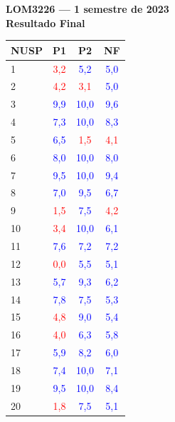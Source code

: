 \documentclass[12pt]{article}
\begin{document}
\thispagestyle{empty}
\centering
\begin{center}
{\LARGE \bfseries LOM3226 --- 1\textordmasculine{} semestre de 2023}\\[4mm] 
{\Large \bfseries Resultado Final} 
\end{center} 
\vfill
\begin{multicols}{2}
\centering 
{} 
\begin{tabular}{lccc} 
\hline 
\rowcolor{gray!50}\textbf{NUSP} & \textbf{P1} & \textbf{P2} & \textbf{NF} \\ 
\hline 
1 & \textcolor{red}{3,2} & \textcolor{blue}{5,2} & \textcolor{blue}{5,0} \\ 
2 & \textcolor{red}{4,2} & \textcolor{red}{3,1} & \textcolor{blue}{5,0} \\ 
3 & \textcolor{blue}{9,9} & \textcolor{blue}{10,0} & \textcolor{blue}{9,6} \\ 
4 & \textcolor{blue}{7,3} & \textcolor{blue}{10,0} & \textcolor{blue}{8,3} \\ 
5 & \textcolor{blue}{6,5} & \textcolor{red}{1,5} & \textcolor{red}{4,1} \\ 
6 & \textcolor{blue}{8,0} & \textcolor{blue}{10,0} & \textcolor{blue}{8,0} \\ 
7 & \textcolor{blue}{9,5} & \textcolor{blue}{10,0} & \textcolor{blue}{9,4} \\ 
8 & \textcolor{blue}{7,0} & \textcolor{blue}{9,5} & \textcolor{blue}{6,7} \\ 
9 & \textcolor{red}{1,5} & \textcolor{blue}{7,5} & \textcolor{red}{4,2} \\ 
10 & \textcolor{red}{3,4} & \textcolor{blue}{10,0} & \textcolor{blue}{6,1} \\ 
11 & \textcolor{blue}{7,6} & \textcolor{blue}{7,2} & \textcolor{blue}{7,2} \\ 
12 & \textcolor{red}{0,0} & \textcolor{blue}{5,5} & \textcolor{blue}{5,1} \\ 
13 & \textcolor{blue}{5,7} & \textcolor{blue}{9,3} & \textcolor{blue}{6,2} \\ 
14 & \textcolor{blue}{7,8} & \textcolor{blue}{7,5} & \textcolor{blue}{5,3} \\ 
15 & \textcolor{red}{4,8} & \textcolor{blue}{9,0} & \textcolor{blue}{5,4} \\ 
16 & \textcolor{red}{4,0} & \textcolor{blue}{6,3} & \textcolor{blue}{5,8} \\ 
17 & \textcolor{blue}{5,9} & \textcolor{blue}{8,2} & \textcolor{blue}{6,0} \\ 
18 & \textcolor{blue}{7,4} & \textcolor{blue}{10,0} & \textcolor{blue}{7,1} \\ 
19 & \textcolor{blue}{9,5} & \textcolor{blue}{10,0} & \textcolor{blue}{8,4} \\ 
20 & \textcolor{red}{1,8} & \textcolor{blue}{7,5} & \textcolor{blue}{5,1} \\ 


\end{tabular}
\end{multicols}
\end{document}
